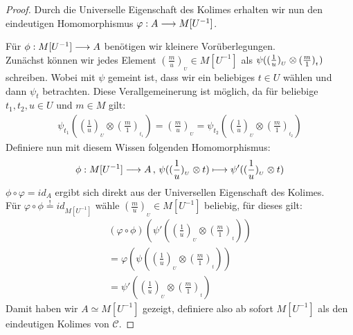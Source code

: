 \documentclass[10pt,a4paper]{report}
\newcommand{\functionfront}[3]{\nolinebreak{#1:#2 \longrightarrow #3}}
\newcommand{\function}[5]{\nolinebreak{#1:#2 \longrightarrow #3 \, , \, #4 \longmapsto #5}}
\newcommand{\tensor}[3]{#1 \otimes #3}
\newcommand{\lok}[2]{#1 [#2^{-1}]}
\newcommand{\loke}[3]{(\frac{#1}{#2})_{_{#3}}}
\newcommand*{\defshow}{\stackrel{!}{=}}
\begin{document}
\begin{proof}
Durch die Universelle Eigenschaft des Kolimes erhalten wir nun den eindeutigen Homomorphismus $\functionfront{\varphi}{A}{\lok{M}{U}}$.
\begin{center}
\end{center}
Für $\functionfront{\phi}{\lok{M}{U}}{A}$ benötigen wir kleinere Vorüberlegungen.\\
Zunächst können wir jedes Element $\loke{m}{u}{U} \in \lok{M}{U}$ als $\nolinebreak{\psi(\tensor{\loke{1}{u}{U}}{\lok{M}{t}}{\loke{m}{1}{t}}})$ schreiben.
Wobei mit $\psi$ gemeint ist, dass wir ein beliebiges $t \in U$ wählen und dann $\psi_t$ betrachten. Diese Verallgemeinerung ist möglich, da für beliebige $t_1,t_2,u \in U$ und $m \in M$ gilt:
\begin{gather*}
\psi_{t_1}({\tensor{\loke{1}{u}{U}}{\lok{M}{t_1}}{\loke{m}{1}{t_1}}}) =
\loke{m}{u}{U} = 
\psi_{t_2}({\tensor{\loke{1}{u}{U}}{\lok{M}{t_2}}{\loke{m}{1}{t_2}}})
\end{gather*}
Definiere nun mit diesem Wissen folgenden Homomorphismus:
\begin{gather*}
\function{\phi}{\lok{M}{U}}{A}{\psi(\tensor{\loke{1}{u}{U}}{\lok{\loke{m}{1}{}}{M}}{t})}{\psi'(\tensor{\loke{1}{u}{U}}{\lok{\loke{m}{1}{t}}{M}}{t})}
\end{gather*}
$\phi \circ \varphi = id_A$ ergibt sich direkt aus der Universellen Eigenschaft des Kolimes.\\
Für $\varphi \circ \phi \defshow id_{\lok{M}{U}}$ wähle $\loke{m}{u}{U} \in \lok{M}{U}$ beliebig, für dieses gilt:
\begin{gather*}
(\varphi \circ \phi) (\psi'(\tensor{\loke{1}{u}{U}}{\lok{M}{t}}{\loke{m}{1}{t}})) \\
 =\varphi(\psi(\tensor{\loke{1}{u}{U}}{\lok{M}{t}}{\loke{m}{1}{t}})) \\
  =\psi'(\tensor{\loke{1}{u}{U}}{\lok{M}{t}}{\loke{m}{1}{t}})
\end{gather*}
Damit haben wir $A \simeq \lok{M}{U}$ gezeigt, definiere also ab sofort $\lok{M}{U}$ als den eindeutigen Kolimes von $\mathcal{C}$.
\end{proof}
\ \\
\end{document}
